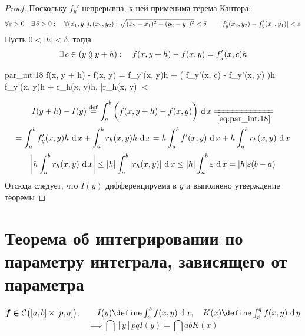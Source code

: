 \begin{proof}
	Поскольку $ f_y' $ непрерывна, к ней применима терема Кантора:
	$$ \forall \varepsilon > 0 \quad \exists\, \delta > 0 : \quad \forall (x_1, y_1), (x_2, y_2) : \sqrt{(x_2 - x_1)^2 + (y_2 - y_1)^2} < \delta \qquad |f_y'(x_2, y_2) - f_y'(x_1, y_1)| < \varepsilon $$
	Пусть $ 0 < |h| < \delta $, тогда
	$$ \exists\, c \in (y \between y + h) : \quad f(x, y + h) - f(x, y) = f_y'(x, c)h $$
	\begin{equ}{par_int:18}
		f(x, y + h) - f(x, y) = f_y'(x, y)h + \bigg( f_y'(x, c) - f_y'(x, y) \bigg)h  f_y'(x, y)h + r_h(x, y)h, \qquad |r_h(x, y)| < \veps
	\end{equ}
	\begin{multline*}
		I(y + h) - I(y) \bydef \dint{a}b{\bigg( f(x, y + h) - f(x, y) \bigg)} \undereq{\eref{par_int:18}} \\
		= \dint{a}b{f_y'(x, y)h} + \dint{a}b{r_h(x, y)h} = h\dint{a}b{f'(x, y)} + h\dint{a}b{r_h(x, y)}
	\end{multline*}
	$$ \bigg| h\int_{a}^{b} {r_h(x, y)} \, \operatorname{d} {x}\bigg| \le |h| \int_{a}^{b} {|r_h(x, y)|} \, \operatorname{d} {x} \le |h| \int_{a}^{b} {\varepsilon} \, \operatorname{d} {x} = |h|\varepsilon(b - a) $$
	Отсюда следует, что $ I(y) $ дифференцируема в $ y $ и выполнено утверждение теоремы
\end{proof}

\section{Теорема об интегрировании по параметру интеграла, зависящего от параметра}

\begin{theorem}
	$ \bm{f \in} \Cont{[a, b] \times [p, q]}, \qquad I(y) \define \dint{a}b{f(x, y)}, \quad K(x) \define \dint[y]{p}q{f(x, y)} $
	$$ \implies \dint[y]pq{I(y)} \bm= \dint{a}b{K(x)} $$
\end{theorem}

